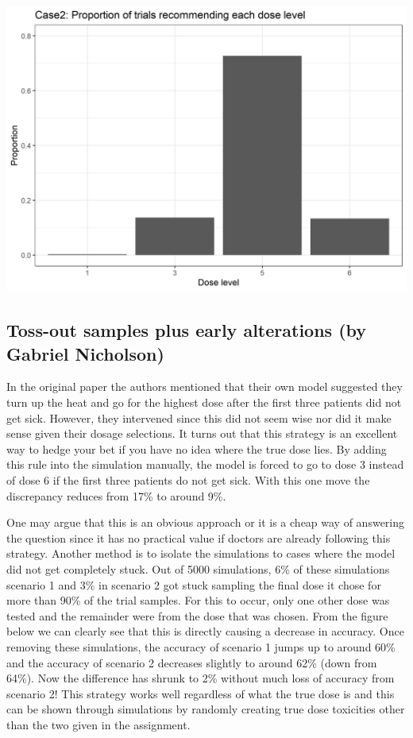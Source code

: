 \documentclass[
]{article}
\begin{document}
\includegraphics{zikai_sim_results/Case2_Proportion of trials recommending each dose level.png}

\hypertarget{toss-out-samples-plus-early-alterations-by-gabriel-nicholson}{%
\subsection{Toss-out samples plus early alterations (by Gabriel
Nicholson)}\label{toss-out-samples-plus-early-alterations-by-gabriel-nicholson}}

In the original paper the authors mentioned that their own model
suggested they turn up the heat and go for the highest dose after the
first three patients did not get sick. However, they intervened since
this did not seem wise nor did it make sense given their dosage
selections. It turns out that this strategy is an excellent way to hedge
your bet if you have no idea where the true dose lies. By adding this
rule into the simulation manually, the model is forced to go to dose 3
instead of dose 6 if the first three patients do not get sick. With this
one move the discrepancy reduces from 17\% to around 9\%.

One may argue that this is an obvious approach or it is a cheap way of
answering the question since it has no practical value if doctors are
already following this strategy. Another method is to isolate the
simulations to cases where the model did not get completely stuck. Out
of 5000 simulations, 6\% of these simulations scenario 1 and 3\% in
scenario 2 got stuck sampling the final dose it chose for more than 90\%
of the trial samples. For this to occur, only one other dose was tested
and the remainder were from the dose that was chosen. From the figure
below we can clearly see that this is directly causing a decrease in
accuracy. Once removing these simulations, the accuracy of scenario 1
jumps up to around 60\% and the accuracy of scenario 2 decreases
slightly to around 62\% (down from 64\%). Now the difference has shrunk
to 2\% without much loss of accuracy from scenario 2! This strategy
works well regardless of what the true dose is and this can be shown
through simulations by randomly creating true dose toxicities other than
the two given in the assignment.
\end{document}
